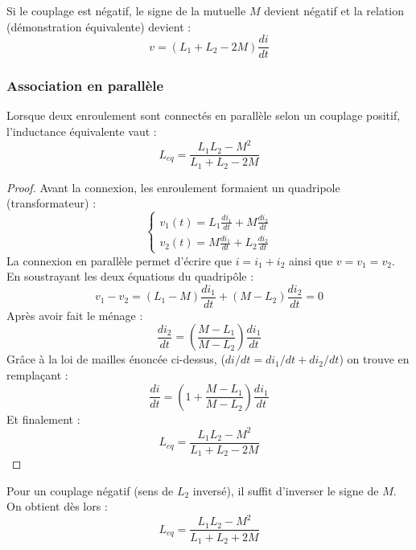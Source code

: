 \documentclass	[11pt, a4paper, openany]{book}
\begin{document}
Si le couplage est négatif, le signe de la mutuelle $M$ devient négatif et la relation (démonstration équivalente) devient :
\begin{equation}
v = (L_1 + L_2 - 2M)\frac{di}{dt}
\end{equation}

\subsubsection{Association en parallèle}
Lorsque deux enroulement sont connectés en parallèle selon un couplage positif, l'inductance équivalente vaut :
\begin{equation}
L_{eq} = \frac{L_1L_2-M^2}{L_1+L_2-2M}
\end{equation}
\begin{proof}
Avant la connexion, les enroulement formaient un quadripole (transformateur) :
\begin{equation}
\left\{\begin{array}{l}
v_1(t) = L_1\frac{di_1}{dt} + M \frac{di_2}{dt}\\
v_2(t) = M\frac{di_1}{dt} + L_2 \frac{di_2}{dt}
\end{array}\right.
\end{equation}
La connexion en parallèle permet d'écrire que $i = i_1 + i_2$ ainsi que $v = v_1 = v_2$.\\

En soustrayant les deux équations du quadripôle :
\begin{equation}
v_1 - v_2 =(L_1-M)\frac{di_1}{dt} + (M-L_2)\frac{di_2}{dt} = 0
\end{equation}
Après avoir fait le ménage :
\begin{equation}
\frac{di_2}{dt} = \left(\frac{M-L_1}{M-L_2}\right)\frac{di_1}{dt}
\end{equation}
Grâce à la loi de mailles énoncée ci-dessus, ($di/dt = di_1/dt + di_2/dt$) on trouve en remplaçant :
\begin{equation}
\frac{di}{dt} = \left(1+\frac{M-L_1}{M-L_2}\right)\frac{di_1}{dt}
\end{equation}
Et finalement : 
\begin{equation}
L_{eq} = \frac{L_1L_2-M^2}{L_1+L_2-2M}
\end{equation}
\end{proof}
Pour un couplage négatif (sens de $L_2$ inversé), il suffit d'inverser le signe de $M$. On obtient dès lors :
\begin{equation}
L_{eq} = \frac{L_1L_2-M^2}{L_1+L_2+2M}
\end{equation}
\end{document}
